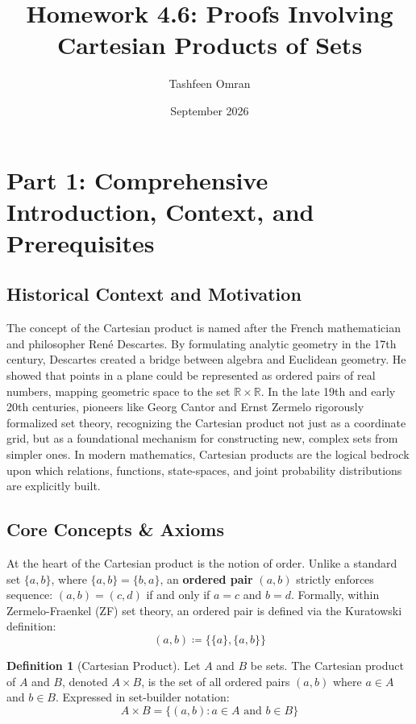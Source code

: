 \documentclass[12pt]{article}
\title{Homework 4.6: Proofs Involving Cartesian Products of Sets}
\author{Tashfeen Omran}
\date{September 2026}
\theoremstyle{definition}
\newtheorem{definition}{Definition}[section]
\theoremstyle{remark}
\begin{document}
\maketitle
\tableofcontents
\newpage

\section{Part 1: Comprehensive Introduction, Context, and Prerequisites}

\subsection{Historical Context and Motivation}
The concept of the Cartesian product is named after the French mathematician and philosopher René Descartes. By formulating analytic geometry in the 17th century, Descartes created a bridge between algebra and Euclidean geometry. He showed that points in a plane could be represented as ordered pairs of real numbers, mapping geometric space to the set $\mathbb{R} \times \mathbb{R}$. In the late 19th and early 20th centuries, pioneers like Georg Cantor and Ernst Zermelo rigorously formalized set theory, recognizing the Cartesian product not just as a coordinate grid, but as a foundational mechanism for constructing new, complex sets from simpler ones. In modern mathematics, Cartesian products are the logical bedrock upon which relations, functions, state-spaces, and joint probability distributions are explicitly built.

\subsection{Core Concepts \& Axioms}
At the heart of the Cartesian product is the notion of order. Unlike a standard set $\{a, b\}$, where $\{a, b\} = \{b, a\}$, an \textbf{ordered pair} $(a, b)$ strictly enforces sequence: $(a, b) = (c, d)$ if and only if $a = c$ and $b = d$. Formally, within Zermelo-Fraenkel (ZF) set theory, an ordered pair is defined via the Kuratowski definition: 
\[ (a, b) \coloneqq \{\{a\}, \{a, b\}\} \]

\begin{definition}[Cartesian Product]
Let $A$ and $B$ be sets. The Cartesian product of $A$ and $B$, denoted $A \times B$, is the set of all ordered pairs $(a, b)$ where $a \in A$ and $b \in B$. Expressed in set-builder notation:
\[ A \times B = \{(a, b) : a \in A \text{ and } b \in B\} \]
\end{definition}
\end{document}
